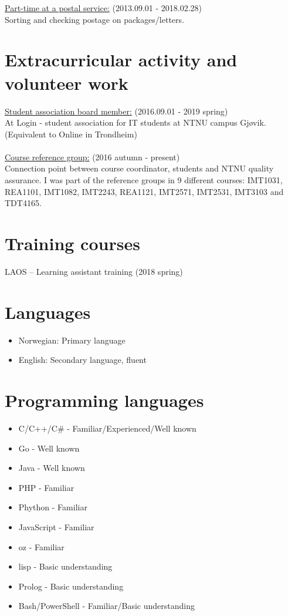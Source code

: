 \documentclass{crudecv/crudecv}
\begin{document}
\underline{Part-time at a postal service:} \hfill (2013.09.01 - 2018.02.28)\\
Sorting and checking postage on packages/letters.\\

\section*{Extracurricular activity and volunteer work}
\underline{Student association board member:} \hfill (2016.09.01 - 2019 spring) \\
At Login - student association for IT students at NTNU campus Gj\o vik. (Equivalent to Online in Trondheim) \\~\\

\underline{Course reference group:}  \hfill (2016 autumn - present) \\
Connection point between course coordinator, students and NTNU quality assurance. I was part of the reference groups in 9 different courses: IMT1031, REA1101, IMT1082, IMT2243, REA1121, IMT2571, IMT2531, IMT3103 and TDT4165.

\section{Training courses}
LAOS – Learning assistant training \hfill (2018 spring)

\section{Languages}
\begin{itemize}
    \item Norwegian: Primary language
    \item English: Secondary language, fluent
\end{itemize}


\section{Programming languages}
\begin{multicols}{2}
\begin{itemize}
    \item C/C++/C\# - Familiar/Experienced/Well known
    \item Go - Well known
    \item Java - Well known
    \item PHP - Familiar
    \item Phython - Familiar
    \item JavaScript - Familiar
    \item oz - Familiar
    \item lisp - Basic understanding
    \item Prolog - Basic understanding
    \item Bash/PowerShell - Familiar/Basic understanding
\end{itemize}
\end{multicols}
\end{document}
